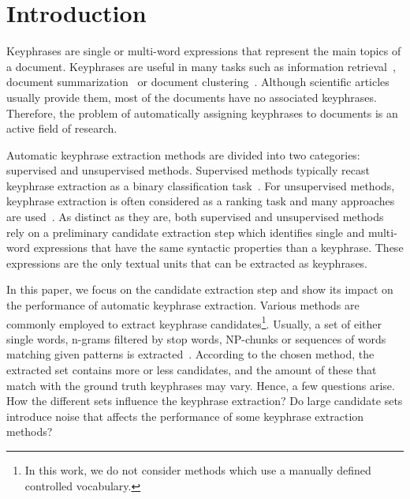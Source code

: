 \section{Introduction}
\label{sec:section}
  Keyphrases are single or multi-word expressions that represent the main topics
  of a document. Keyphrases are useful in many tasks such as information
  retrieval~\cite{medelyan2008smalltrainingset}, document
  summarization~\cite{litvak2008graphbased} or document
  clustering~\cite{han2007webdocumentclustering}. Although scientific articles
  usually provide them, most of the documents have no associated keyphrases.
  Therefore, the problem of automatically assigning keyphrases to documents is
  an active field of research.

  Automatic keyphrase extraction methods are divided into two categories:
  supervised and unsupervised methods. Supervised methods typically recast
  keyphrase extraction as a binary classification
  task~\cite{witten1999kea,sujian2003maximumentropy,eichler2010keywe}. For
  unsupervised methods, keyphrase extraction is often considered as a ranking
  task and many approaches are
  used~\cite{barker2000nounphrasehead,tomokiyo2003languagemodel,mihalcea2004textrank}.
  As distinct as they are, both supervised and unsupervised methods rely on a
  preliminary candidate extraction step which identifies single and multi-word
  expressions that have the same syntactic properties than a keyphrase. These
  expressions are the only textual units that can be extracted as keyphrases.
  
  In this paper, we focus on the candidate extraction step and show its impact
  on the performance of automatic keyphrase extraction. Various methods
  are commonly employed to extract keyphrase candidates\footnote{In this work,
  we do not consider methods which use a manually defined controlled
  vocabulary.}. Usually, a set of either single words, n-grams filtered by stop
  words, NP-chunks or sequences of words matching given patterns is
  extracted~\cite{hulth2003keywordextraction}. According to the chosen method,
  the extracted set contains more or less candidates, and the amount of these
  that match with the ground truth keyphrases may vary. Hence, a few questions
  arise. How the different sets influence the keyphrase extraction? Do large
  candidate sets introduce noise that affects the performance of some keyphrase
  extraction methods?

